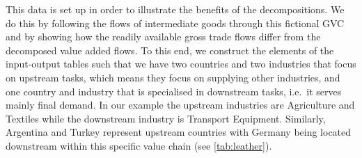 \documentclass[a4paper,11pt]{article}
\begin{document}
This data is set up in order to illustrate the benefits of the decompositions. We do this by following the flows of intermediate goods through this fictional GVC and by showing how the readily available gross trade flows differ from the decomposed value added flows.
To this end, we construct the elements of the input-output tables such that we have two countries and two industries that focus on upstream tasks,  which means they focus on supplying other industries, and one country and industry that is specialised in downstream tasks, i.e.~it serves mainly final demand. In our example the upstream industries are Agriculture and Textiles while the downstream industry is Transport Equipment.
Similarly, Argentina and Turkey represent upstream countries with Germany being located downstream within this specific value chain (see \cref{tab:leather}).
\end{document}
